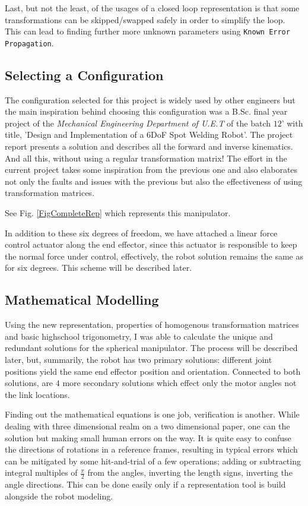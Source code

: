 {{        Last, but not the least, of the usages of a closed loop representation is that some transformations can be skipped/swapped safely in order to simplify the loop. This can lead to finding further more unknown parameters using \texttt{Known Error Propagation}.

    }
    \subsection{Selecting a Configuration}
    {
        The configuration selected for this project is widely used by other engineers but the main inspiration behind choosing this configuration was a B.Sc. final year project of the \emph{Mechanical Engineering Department of U.E.T} of the batch $12$' with title, 'Design and Implementation of a $6$DoF Spot Welding Robot'. The project report presents a solution and describes all the forward and inverse kinematics. And all this, without using a regular transformation matrix! The effort in the current project takes some inspiration from the previous one and also elaborates not only the faults and issues with the previous but also the effectiveness of using transformation matrices.

        See Fig. \ref{FigCompleteRep} which represents this manipulator.

        In addition to these six degrees of freedom, we have attached a linear force control actuator along the end effector, since this actuator is responsible to keep the normal force under control, effectively, the robot solution remains the same as for six degrees. This scheme will be described later.
    }
    \subsection{Mathematical Modelling}
    {
        Using the new representation, properties of homogenous transformation matrices and basic highschool trigonometry,  I was able to calculate the unique and redundant solutions for the spherical manipulator. The process will be described later, but, summarily, the robot has two primary solutions: different joint positions yield the same end effector position and orientation. Connected to both solutions, are $4$ more secondary solutions which effect only the motor angles not the link locations.

        Finding out the mathematical equations is one job, verification is another. While dealing with three dimensional realm on a two dimensional paper, one can the solution but making small human errors on the way. It is quite easy to confuse the directions of rotations in a reference frames, resulting in typical errors which can be mitigated by some hit-and-trial of a few operations; adding or subtracting integral multiples of $\frac{\pi}{2}$ from the angles, inverting the length signs, inverting the angle directions. This can be done easily only if a representation tool is build alongside the robot modeling.
    }
}
